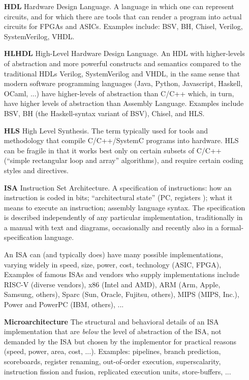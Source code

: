 \begin{itemize}
\item[\bf HDL] Hardware Design Language.  A language in which one can
  represent circuits, and for which there are tools that can render a
  program into actual circuits for FPGAs and ASICs.  Examples include:
  BSV, BH, Chisel, Verilog, SystemVerilog, VHDL.

\item[\bf HLHDL] High-Level Hardware Design Language.  An HDL with
  higher-levels of abstraction and more powerful constructs and
  semantics compared to the traditional HDLs Verilog, SystemVerilog
  and VHDL, in the same sense that modern software programming
  languages (Java, Python, Javascript, Haskell, OCaml, ...) have
  higher-levels of abstraction than C/C++ which, in turn, have higher
  levels of abstraction than Assembly Language.  Examples include BSV,
  BH (the Haskell-syntax variant of BSV), Chisel, and HLS.

\item[\bf HLS] High Level Synthesis.  The term typically used for
  tools and methodology that compile C/C++/SystemC programs into
  hardware.  HLS can be fragile in that it works best only on certain
  subsets of C/C++ (``simple rectangular loop and array'' algorithms),
  and require certain coding styles and directives.

\item[\bf ISA] Instruction Set Architecture.  A specification of
  instructions: how an instruction is coded in bits; ``architectural
  state'' (PC, registers {\etc}); what it means to execute an
  instruction; assembly language syntax.  The specification is
  described independently of any particular implementation,
  traditionally in a manual with text and diagrams, occasionally and
  recently also in a formal-specification language.

  An ISA can (and typically does) have many possible implementations,
  varying widely in speed, size, power, cost, technology (ASIC, FPGA),
  {\etc} Examples of famous ISAs and vendors who supply
  implementations include RISC-V (diverse vendors), x86 (Intel and
  AMD), ARM (Arm, Apple, Samsung, others), Sparc (Sun, Oracle,
  Fujitsu, others), MIPS (MIPS, Inc.), Power and PowerPC (IBM,
  others), ...

\item[\bf Microarchitecture] The structural and behavioral details of
  an ISA implementation that are \emph{below} the level of abstraction
  of the ISA, {\ie} not demanded by the ISA but chosen by the
  implementor for practical reasons (speed, power, area, cost, ...).
  Examples: pipelines, branch prediction, scoreboards, register
  renaming, out-of-order execution, superscalarity, instruction
  fission and fusion, replicated execution units, store-buffers, ...


\end{itemize}
